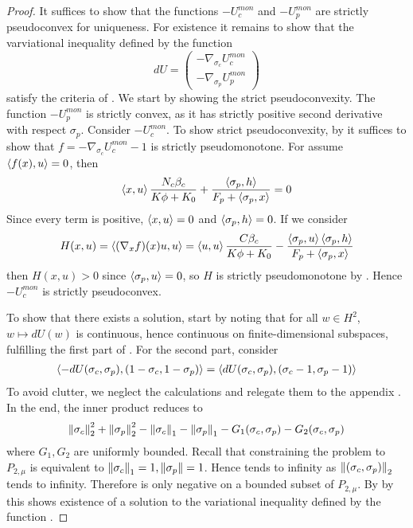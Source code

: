 \begin{proof}
  It suffices to show that the functions $-U_c^{mon}$ and $-U_p^{mon}$ are strictly pseudoconvex for uniqueness. For existence it remains to show that the varviational inequality defined by the function
  \begin{equation}
    \label{eq:var_ineq}
    dU = \begin{pmatrix}-\nabla_{\sigma_c} U_c^{mon} \\ -\nabla_{\sigma_p} U_p^{mon}\end{pmatrix}
  \end{equation} satisfy the criteria of .
  We start by showing the strict pseudoconvexity. The function $-U_p^{mon}$ is strictly convex, as it has strictly positive second derivative with respect $\sigma_p$. Consider $-U_c^{mon}$. To show strict pseudoconvexity, by  it suffices to show that $f = -\nabla_{\sigma_c} U_c^{mon} - 1$ is strictly pseudomonotone. For  assume $\left \langle f(x),u \right \rangle = 0$, then
  \begin{equation}
    \ip{x}{u}\frac{N_c \beta_c }{K\phi + K_0} + \frac{\ip{\sigma_p}{h}}{F_p + \ip{\sigma_p}{x}} = 0
  \end{equation}
  Since every term is positive, $\left \langle x,u \right \rangle = 0$ and $\left \langle \sigma_p,h \right \rangle = 0$. If we consider
  \begin{equation}
    H(x,u)=\ip{(\nabla_x f)(x)u}{u} = \ip{u}{u}\frac{ C \beta_c }{K\phi + K_0} - \frac{\ip{\sigma_p}{u}\ip{\sigma_p}{h}}{F_p + \ip{\sigma_p}{x}}
  \end{equation}
  then $H(x,u)>0$ since $\left \langle \sigma_p,u \right \rangle=0$, so $H$ is strictly pseudomonotone by . Hence $-U_c^{mon}$ is strictly pseudoconvex.

  To show that there exists a solution, start by noting that for all $w\in H^2$, $w\mapsto dU(w)$ is continuous, hence continuous on finite-dimensional subspaces, fulfilling the first part of . For the second part,  consider
  \begin{equation}
    \label{eq:du}
    \begin{split}
    \left \langle -dU(\sigma_c,\sigma_p),(1-\sigma_c, 1-\sigma_p) \right \rangle =
    \left \langle dU(\sigma_c,\sigma_p),(\sigma_c-1, \sigma_p-1) \right \rangle
  \end{split}
  \end{equation}
  To avoid clutter, we neglect the calculations and relegate them to the appendix . In the end, the inner product reduces to
  \begin{equation}
    \label{eq:fin_exist}
    \left \Vert \sigma_c \right \Vert_2^2 + \left \Vert \sigma_p \right \Vert_2^2 - \left \Vert \sigma_c \right \Vert_1 - \left \Vert \sigma_p \right \Vert_1 - G_1(\sigma_c,\sigma_p) - G_2(\sigma_c,\sigma_p)
  \end{equation}
  where $G_1,G_2$ are uniformly bounded. Recall that constraining the problem to $P_{2,\mu}$ is equivalent to $\left \Vert \sigma_c \right \Vert_1 = 1, \left \Vert \sigma_p \right \Vert = 1$. Hence  tends to infinity as $\left \Vert (\sigma_c,\sigma_p) \right \Vert_2$ tends to infinity. Therefore  is only negative on a bounded subset of $P_{2,\mu}$. By by  this shows existence of a solution to the variational inequality defined by the function .


\end{proof}
